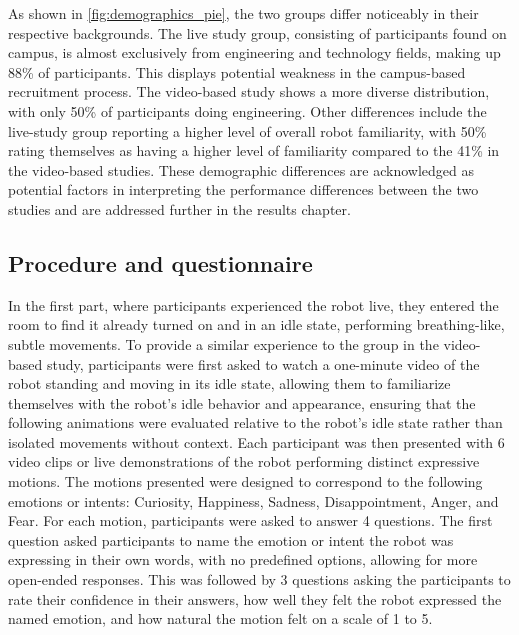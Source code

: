 As shown in \autoref{fig:demographics_pie}, the two groups differ noticeably in their respective backgrounds. The live study group, consisting of participants found on campus, is almost exclusively from engineering and technology fields, making up 88\% of participants. This displays potential weakness in the campus-based recruitment process. The video-based study shows a more diverse distribution, with only 50\% of participants doing engineering. Other differences include the live-study group reporting a higher level of overall robot familiarity, with 50\% rating themselves as having a higher level of familiarity compared to the 41\% in the video-based studies. These demographic differences are acknowledged as potential factors in interpreting the performance differences between the two studies and are addressed further in the results chapter.


\subsection{Procedure and questionnaire} 
In the first part, where participants experienced the robot live, they entered the room to find it already turned on and in an idle state, performing breathing-like, subtle movements. To provide a similar experience to the group in the video-based study, participants were first asked to watch a one-minute video of the robot standing and moving in its idle state, allowing them to familiarize themselves with the robot's idle behavior and appearance, ensuring that the following animations were evaluated relative to the robot's idle state rather than isolated movements without context. Each participant was then presented with 6 video clips or live demonstrations of the robot performing distinct expressive motions. The motions presented were designed to correspond to the following emotions or intents: Curiosity, Happiness, Sadness, Disappointment, Anger, and Fear. For each motion, participants were asked to answer 4 questions. The first question asked participants to name the emotion or intent the robot was expressing in their own words, with no predefined options, allowing for more open-ended responses. This was followed by 3 questions asking the participants to rate their confidence in their answers, how well they felt the robot expressed the named emotion, and how natural the motion felt on a scale of 1 to 5.


